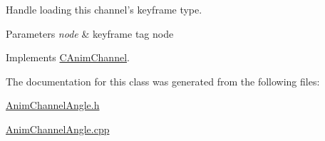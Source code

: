 Handle loading this channel's keyframe type. 


\begin{DoxyParams}{Parameters}
{\em node} & keyframe tag node \\
\hline
\end{DoxyParams}


Implements \hyperlink{class_c_anim_channel_a2df7b3fed2b3faf34c585446628fc874}{C\+Anim\+Channel}.



The documentation for this class was generated from the following files\+:\begin{DoxyCompactItemize}
\item 
\hyperlink{_anim_channel_angle_8h}{Anim\+Channel\+Angle.\+h}\item 
\hyperlink{_anim_channel_angle_8cpp}{Anim\+Channel\+Angle.\+cpp}\end{DoxyCompactItemize}
